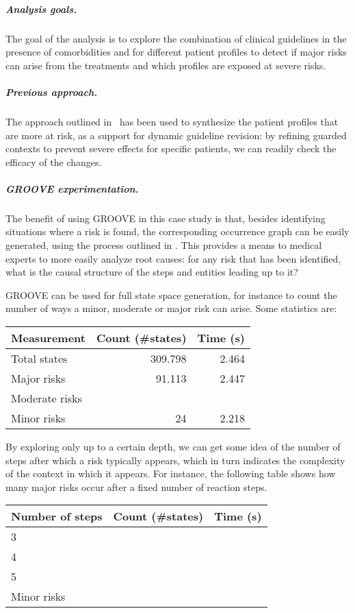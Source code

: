 \subparagraph*{Analysis goals.}
The goal of the analysis is to explore the combination of clinical guidelines in the presence of comorbidities and for different patient profiles to detect if major risks can arise from the treatments and which profiles are exposed at severe risks.

\subparagraph*{Previous approach.}
The approach outlined in~\cite{DBLP:conf/cmsb/BowlesBBFGM24} has been used to synthesize the patient profiles that are more at risk, as a support for dynamic guideline revision: by refining guarded contexts to prevent severe effects for specific patients, we can readily check the efficacy of the changes.

\subparagraph*{GROOVE experimentation.}

The benefit of using GROOVE in this case study is that, besides identifying situations where a risk is found, the corresponding occurrence graph can be easily generated, using the process outlined in . This provides a means to medical experts to more easily analyze root causes: for any risk that has been identified, what is the causal structure of the steps and entities leading up to it?

GROOVE can be used for full state space generation, for instance to count the number of ways a minor, moderate or major risk can arise. Some statistics are:

\begin{center}
\begin{tabular}{lrr}
\bf Measurement & \bf Count (\#states) & Time (s) \\
\hline
Total states & 309.798 & 2.464 \\
Major risks & 91.113 & 2.447 \\
Moderate risks & & \\
Minor risks & 24 & 2.218
\end{tabular}
\end{center}

By exploring only up to a certain depth, we can get some idea of the number of steps after which a risk typically appears, which in turn indicates the complexity of the context in which it appears. For instance, the following table shows how many major risks occur after a fixed number of reaction steps.

\begin{center}
\begin{tabular}{lrr}
\bf Number of steps & \bf Count (\#states) & Time (s) \\
\hline
3 & & \\
4 & & \\
5 & & \\
Minor risks & & 
\end{tabular}
\end{center}

